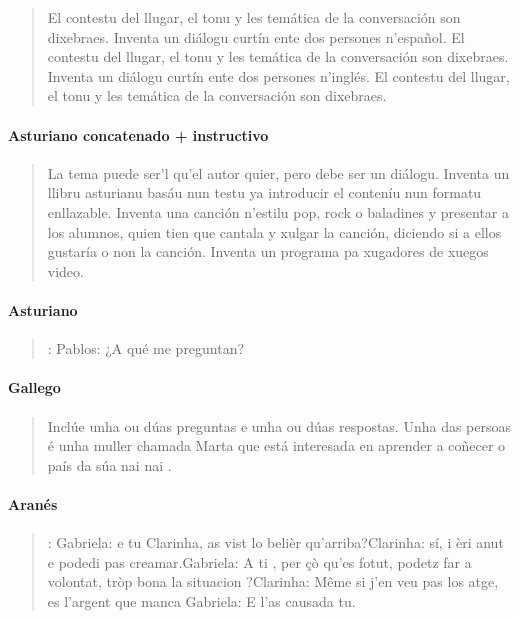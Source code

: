 \begin{quote}
El contestu del llugar, el tonu y les temática de la conversación son dixebraes.
Inventa un diálogu curtín ente dos persones n'español. El contestu del llugar, el tonu y les temática de la conversación son dixebraes.
Inventa un diálogu curtín ente dos persones n'inglés. El contestu del llugar, el tonu y les temática de la conversación son dixebraes.
\end{quote}

\paragraph{Asturiano concatenado + instructivo}

\begin{quote}
La tema puede ser'l qu'el autor quier, pero debe ser un diálogu.
Inventa un llibru asturianu basáu nun testu ya introducir el conteníu nun formatu enllazable.
Inventa una canción n'estilu pop, rock o baladines y presentar a los alumnos, quien tien que cantala y xulgar la canción, diciendo si a ellos gustaría o non la canción.
Inventa un programa pa xugadores de xuegos video.
\end{quote}

\paragraph{Asturiano}

\begin{quote}
: Pablos: ¿A qué me preguntan?
\end{quote}

\paragraph{Gallego}

\begin{quote}
Inclúe unha ou dúas preguntas e unha ou dúas respostas. Unha das persoas é unha muller chamada Marta que está interesada en aprender a coñecer o país da súa nai nai .
\end{quote}

\paragraph{Aranés}

\begin{quote}
:
    Gabriela: e tu Clarinha, as vist lo belièr qu'arriba?Clarinha: sí, i èri anut e podedi pas creamar.Gabriela: A ti , per çò qu'es fotut, podetz far a volontat, tròp bona la situacion ?Clarinha: Même si j'en veu pas los atge, es l'argent que manca Gabriela: E l'as causada tu.
\end{quote}

